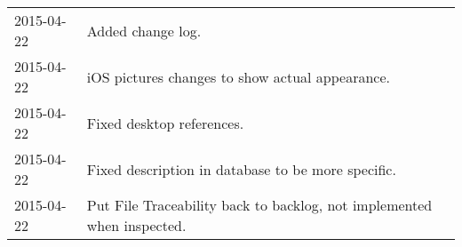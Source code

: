 
\begin{tabular}{ll}
	2015-04-22 & Added change log.\\
	2015-04-22 & iOS pictures changes to show actual appearance.\\
    2015-04-22 & Fixed desktop references. \\
	2015-04-22 & Fixed description in database to be more specific. \\
	2015-04-22 & Put File Traceability back to backlog, not implemented when inspected.\\
\end{tabular}
